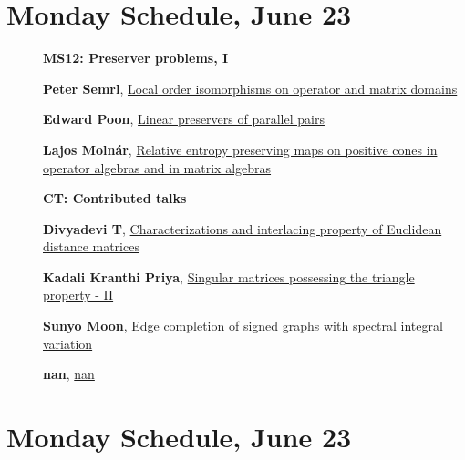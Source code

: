 \documentclass[ILAS2025-program.tex]{subfiles}
\begin{document}
\section*{Monday Schedule, June 23 }
        
        \begin{description}
    \item[] {\color{mstitle}\textbf{MS12: Preserver problems, I}} 
    \item[] \hypertarget{up0016}{}\textbf{Peter Semrl}, \hyperlink{down0016}{Local order isomorphisms on operator and matrix domains}
        \item[] \hypertarget{up0017}{}\textbf{Edward Poon}, \hyperlink{down0017}{Linear preservers of parallel pairs}
        \item[] \hypertarget{up0018}{}\textbf{Lajos Molnár}, \hyperlink{down0018}{Relative entropy preserving maps on positive cones in operator algebras and in matrix algebras}
        \end{description}
    \begin{description}
    \item[] {\color{mstitle}\textbf{CT: Contributed talks}} 
    \item[] \hypertarget{up0084}{}\textbf{Divyadevi T}, \hyperlink{down0084}{Characterizations and interlacing property of Euclidean distance matrices}
        \item[] \hypertarget{up0085}{}\textbf{Kadali Kranthi Priya}, \hyperlink{down0085}{Singular matrices possessing the triangle property - II}
        \item[] \hypertarget{up0086}{}\textbf{Sunyo Moon}, \hyperlink{down0086}{Edge completion of signed graphs with spectral integral variation}
        \item[] \hypertarget{up0087}{}\textbf{nan}, \hyperlink{down0087}{nan}
        \end{description}
    \newpage

\section*{Monday Schedule, June 23 }
        
\end{document}
